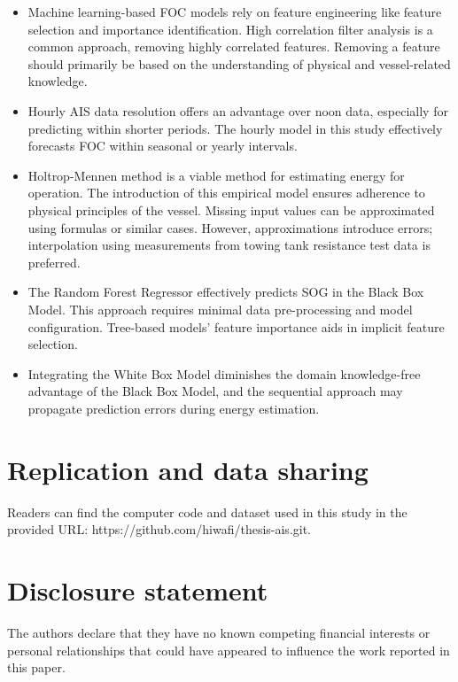 \documentclass[]{interact}
\theoremstyle{plain}%
\theoremstyle{definition}
\theoremstyle{remark}
\begin{document}
\begin{itemize}
  \item Machine learning-based FOC models rely on feature engineering like feature selection and importance identification. High correlation filter analysis is a common approach, removing highly correlated features. Removing a feature should primarily be based on the understanding of physical and vessel-related knowledge.
  \item Hourly AIS data resolution offers an advantage over noon data, especially for predicting within shorter periods. The hourly model in this study effectively forecasts FOC within seasonal or yearly intervals.
  \item Holtrop-Mennen method is a viable method for estimating energy for operation. The introduction of this empirical model ensures adherence to physical principles of the vessel. Missing input values can be approximated using formulas or similar cases. However, approximations introduce errors; interpolation using measurements from towing tank resistance test data is preferred.
  \item The Random Forest Regressor effectively predicts SOG in the Black Box Model. This approach requires minimal data pre-processing and model configuration. Tree-based models' feature importance aids in implicit feature selection. 
  \item Integrating the White Box Model diminishes the domain knowledge-free advantage of the Black Box Model, and the sequential approach may propagate prediction errors during energy estimation.
\end{itemize}

\section*{Replication and data sharing}

Readers can find the computer code and dataset used in this study in the provided URL: https://github.com/hiwafi/thesis-ais.git. 

\section*{Disclosure statement}

The authors declare that they have no known competing financial interests or personal relationships that could have appeared to influence the work reported in this paper.




\end{document}
